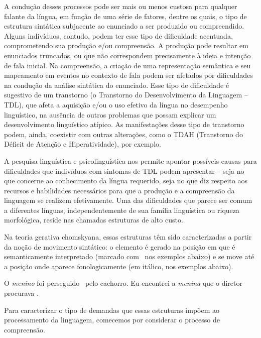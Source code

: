 \documentclass[output=paper,colorlinks,citecolor=brown,booklanguage=portuguese]{langscibook}
\begin{document}
A condução desses processos pode ser mais ou menos custosa para qualquer falante da língua, em função de uma série de fatores, dentre os quais, o tipo de estrutura sintática subjacente ao enunciado a ser produzido ou compreendido. Alguns indivíduos, contudo, podem ter esse tipo de dificuldade acentuada, comprometendo sua produção e/ou compreensão. A produção pode resultar em enunciados truncados, ou que não correspondem precisamente à ideia e intenção de fala inicial. Na compreensão, a criação de uma representação semântica e seu mapeamento em eventos no contexto de fala podem ser afetados por dificuldades na condução da análise sintática do enunciado. Esse tipo de dificuldade é sugestivo de um transtorno (o Transtorno do Desenvolvimento da Linguagem – TDL), que afeta a aquisição e/ou o uso efetivo da língua no desempenho linguístico, na ausência de outros problemas que possam explicar um desenvolvimento linguístico atípico. As manifestações desse tipo de transtorno podem, ainda, coexistir com outras alterações, como o TDAH (Transtorno do Déficit de Atenção e Hiperatividade), por exemplo. 

A pesquisa linguística e psicolinguística nos permite apontar possíveis causas para dificuldades que indivíduos com sintomas de TDL podem apresentar – seja no que concerne ao conhecimento da língua requerido, seja no que diz respeito aos recursos e habilidades necessários para que a produção e a compreensão da linguagem se realizem efetivamente. Uma das dificuldades que parece ser comum a diferentes línguas, independentemente de sua família linguística ou riqueza morfológica, reside nas chamadas estruturas de alto custo.

Na teoria gerativa chomskyana, essas estruturas têm sido caracterizadas a partir da noção de movimento sintático: o elemento é gerado na posição em que é semanticamente interpretado (marcado com \longrule ~nos exemplos abaixo) e se move até a posição onde aparece fonologicamente (em itálico, nos exemplos abaixo).

\ea	O \emph{menino} foi perseguido \longrule ~pelo cachorro.
\z
\ea Eu encontrei a \emph{menina} que o diretor procurava \longrule.
\z


Para caracterizar o tipo de demandas que essas estruturas impõem ao processamento da linguagem, comecemos por considerar o processo de compreensão. 
\end{document}
